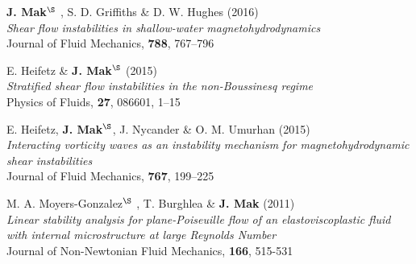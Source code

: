 \documentclass[letterpaper]{article}
\renewenvironment{itemize}{
  \begin{list}{}{
    \setlength{\leftmargin}{1.5em}
  }
}{
  \end{list}
}
\begin{document}
\begin{itemize}
\item[4.] \textbf{J. Mak}$^{\S}$ , S. D. Griffiths \& D. W. Hughes
(2016)\\
\textit{Shear flow instabilities in shallow-water magnetohydrodynamics}\\
Journal of Fluid Mechanics, \textbf{788}, 767--796

\item[3.] E. Heifetz \& \textbf{J. Mak}$^{\S}$ (2015)\\
\textit{Stratified shear flow instabilities in the non-Boussinesq regime}\\
Physics of Fluids, \textbf{27}, 086601, 1--15

\item[2.] E. Heifetz, \textbf{J. Mak}$^{\S}$, J. Nycander \& O. M.
Umurhan (2015)\\
\textit{Interacting vorticity waves as an instability mechanism for
magnetohydrodynamic shear instabilities}\\
Journal of Fluid Mechanics, \textbf{767}, 199--225

\item[1.] M. A. Moyers-Gonzalez$^{\S}$ , T. Burghlea \& \textbf{J. Mak}
(2011)\\
\textit{Linear stability analysis for plane-Poiseuille flow of an
elastoviscoplastic fluid with internal microstructure at large Reynolds
Number}\\
Journal of Non-Newtonian Fluid Mechanics, \textbf{166}, 515-531
\end{itemize}
\end{document}
